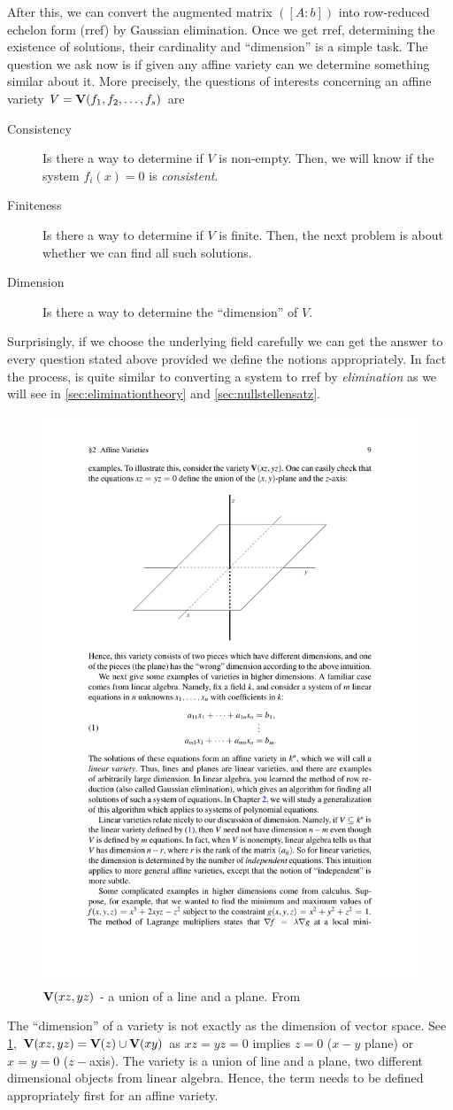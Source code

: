 \documentclass[a4paper,11pt]{article}
\begin{document}
After this, we can convert the augmented matrix $([A:b])$ into row-reduced echelon form (rref) by Gaussian elimination. Once we get rref, determining the existence of solutions, their cardinality and ``dimension'' is a simple task.  The question we ask now is if given any affine variety can we determine something similar about it.
More precisely, the questions of interests concerning an affine variety $V=\textbf{V}(f_1,f_2,\ldots,f_{s})$ are
\begin{description}
    \item[Consistency] Is there a way to determine if $V$ is non-empty. Then, we will know if the system $f_i(x)=0$ is \emph{consistent}.
    \item[Finiteness] Is there a way to determine if $V$ is finite. Then, the next problem is about whether we can find all such solutions.
    \item[Dimension] Is there a way to determine the ``dimension'' of $V$.
\end{description}
Surprisingly, if we choose the underlying field carefully we can get the answer to every question stated above provided we define the notions appropriately. In fact the process, is quite similar to converting a system to rref by \emph{elimination} as we will see in \ref{sec:eliminationtheory} and \ref{sec:nullstellensatz}.
\begin{figure}[!hbt]
    \centering
    \includegraphics[width=0.4\linewidth]{Images/variety_dim.pdf}
    \caption{$\textbf{V}(xz,yz)$ - a union of a line and a plane. From \cite{book:coxlittleoshea}}
    \label{fig:variety_dim}
\end{figure}
\begin{note}
    The ``dimension'' of a variety is not exactly as the dimension of vector space. See \ref{fig:variety_dim}, $\textbf{V}(xz,yz)=\textbf{V}(z)\cup\textbf{V}(xy)$ as $xz=yz=0$ implies $z=0$ ($x-y$ plane) or $x=y=0$ ($z-$axis). The variety is a union of line and a plane, two different dimensional objects from linear algebra. Hence, the term needs to be defined appropriately first for an affine variety.
\end{note}
\end{document}
